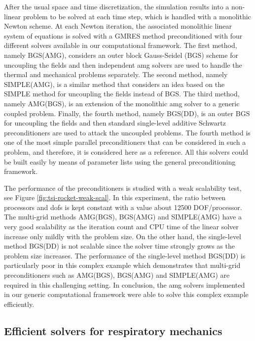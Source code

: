\documentclass{article}
\begin{document}
After the usual space and time discretization, the simulation results into a non-linear problem to be solved at each time step, which is handled with a monolithic Newton scheme. At each Newton iteration, the associated monolithic linear system of equations is solved with a GMRES method preconditioned with four different solvers available in our computational framework. The first method, namely BGS(AMG), considers an outer block Gauss-Seidel (BGS) scheme for uncoupling the fields and then independent \ac{amg} solvers are used to handle the  thermal and mechanical problems separately. The second method, namely SIMPLE(AMG), is a similar method that considers an idea based on the SIMPLE method \cite{Elman2008} for uncoupling the fields instead of BGS. The third method, namely AMG(BGS), is an extension of the monolithic \ac{amg} solver to a generic coupled problem. Finally, the fourth method, namely BGS(DD), is an outer BGS for uncoupling the fields and then standard single-level additive Schwartz preconditioners are used to attack the uncoupled problems. The fourth  method is one of the most simple parallel preconditioners that can be considered in such a problem, and therefore, it is considered here as a reference.  All this solvers could be built easily by means of parameter lists using the general preconditioning framework. 

The performance of the preconditioners is studied with a weak scalability test, see Figure \ref{fig:tsi-rocket-weak-scal}. In this experiment, the ratio between processors and \acp{dof} is kept constant with a value about 12500  DOF/processor. The multi-grid methods AMG(BGS), BGS(AMG) and SIMPLE(AMG) have a very good scalability as the iteration count and CPU time of the linear solver increase only mildly with the problem size. On the other hand, the single-level method BGS(DD) is not scalable since the solver time strongly  grows as the problem size increases. The performance of the single-level method BGS(DD) is particularly poor in this complex example which demonstrates that multi-grid preconditioners such as  AMG(BGS), BGS(AMG) and SIMPLE(AMG) are required in this challenging setting.  In conclusion, the \ac{amg} solvers implemented in our generic computational framework were able to solve this complex example efficiently.

\subsection{Efficient solvers for respiratory mechanics}
\end{document}

